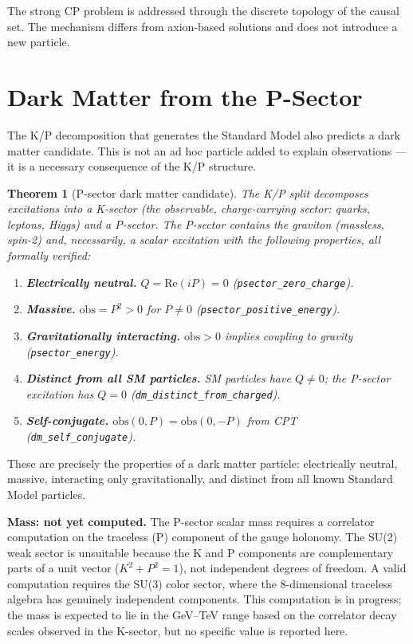 \documentclass[11pt,letterpaper]{article}
\newtheorem{theorem}{Theorem}
\begin{document}
The strong CP problem is addressed through the discrete topology of the
causal set. The mechanism differs from axion-based solutions and does
not introduce a new particle.

\section{Dark Matter from the P-Sector}
\label{sec:darkmatter}

The K/P decomposition that generates the Standard Model also predicts
a dark matter candidate.  This is not an ad hoc particle added to
explain observations --- it is a necessary consequence of the K/P
structure.

\begin{theorem}[P-sector dark matter candidate]
\label{thm:dm}
The K/P split decomposes excitations into a K-sector (the observable,
charge-carrying sector: quarks, leptons, Higgs) and a P-sector.
The P-sector contains the graviton (massless, spin-2) and, necessarily,
a scalar excitation with the following properties, all formally verified:
\begin{enumerate}[nosep]
  \item \textbf{Electrically neutral.}  $Q = \mathrm{Re}(iP) = 0$
    (\texttt{psector\_zero\_charge}).
  \item \textbf{Massive.}  $\mathrm{obs} = P^2 > 0$ for $P \neq 0$
    (\texttt{psector\_positive\_energy}).
  \item \textbf{Gravitationally interacting.}  $\mathrm{obs} > 0$
    implies coupling to gravity
    (\texttt{psector\_energy}).
  \item \textbf{Distinct from all SM particles.}  SM particles have
    $Q \neq 0$; the P-sector excitation has $Q = 0$
    (\texttt{dm\_distinct\_from\_charged}).
  \item \textbf{Self-conjugate.}  $\mathrm{obs}(0,P) =
    \mathrm{obs}(0,-P)$ from CPT
    (\texttt{dm\_self\_conjugate}).
\end{enumerate}
\end{theorem}

\noindent These are precisely the properties of a dark matter particle:
electrically neutral, massive, interacting only gravitationally, and
distinct from all known Standard Model particles.

\medskip
\noindent\textbf{Mass: not yet computed.}
The P-sector scalar mass requires a correlator computation on the
traceless (P) component of the gauge holonomy.  The SU(2) weak
sector is unsuitable because the K and P components are
complementary parts of a unit vector ($K^2 + P^2 = 1$), not
independent degrees of freedom.  A valid computation requires
the SU(3) color sector, where the 8-dimensional traceless algebra
has genuinely independent components.  This computation is in
progress; the mass is expected to lie in the GeV--TeV range based
on the correlator decay scales observed in the K-sector, but no
specific value is reported here.
\end{document}
